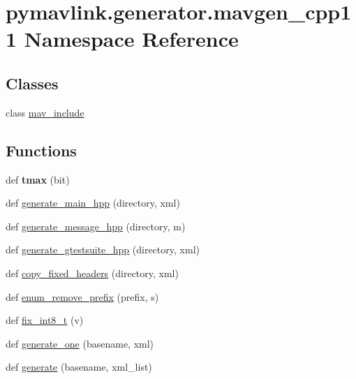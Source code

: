 \hypertarget{namespacepymavlink_1_1generator_1_1mavgen__cpp11}{}\section{pymavlink.\+generator.\+mavgen\+\_\+cpp11 Namespace Reference}
\label{namespacepymavlink_1_1generator_1_1mavgen__cpp11}
\subsection*{Classes}
\begin{DoxyCompactItemize}
\item 
class \hyperlink{classpymavlink_1_1generator_1_1mavgen__cpp11_1_1mav__include}{mav\+\_\+include}
\end{DoxyCompactItemize}
\subsection*{Functions}
\begin{DoxyCompactItemize}
\item 
\mbox{\label{namespacepymavlink_1_1generator_1_1mavgen__cpp11_af2c11cc64c4dac58aa5a7dd8702a5edd}} 
def {\bfseries tmax} (bit)
\item 
def \hyperlink{namespacepymavlink_1_1generator_1_1mavgen__cpp11_a8588e20abc9c34779923fda932483ace}{generate\+\_\+main\+\_\+hpp} (directory, xml)
\item 
def \hyperlink{namespacepymavlink_1_1generator_1_1mavgen__cpp11_a45ff369d71421e11a26c7a69c2f8de6c}{generate\+\_\+message\+\_\+hpp} (directory, m)
\item 
def \hyperlink{namespacepymavlink_1_1generator_1_1mavgen__cpp11_a1eb8c2ef48de5401c229cf9815761666}{generate\+\_\+gtestsuite\+\_\+hpp} (directory, xml)
\item 
def \hyperlink{namespacepymavlink_1_1generator_1_1mavgen__cpp11_a1780acf401220c5fc94513ec4e40fca4}{copy\+\_\+fixed\+\_\+headers} (directory, xml)
\item 
def \hyperlink{namespacepymavlink_1_1generator_1_1mavgen__cpp11_a62a78fb03297e16426b20e29b0f97332}{enum\+\_\+remove\+\_\+prefix} (prefix, s)
\item 
def \hyperlink{namespacepymavlink_1_1generator_1_1mavgen__cpp11_a73fbdce6f04ff5bff120f5c0aca0effb}{fix\+\_\+int8\+\_\+t} (v)
\item 
def \hyperlink{namespacepymavlink_1_1generator_1_1mavgen__cpp11_a64628a652f5243b623280750d9655f7e}{generate\+\_\+one} (basename, xml)
\item 
def \hyperlink{namespacepymavlink_1_1generator_1_1mavgen__cpp11_aa4f8d0bd184389b7d9c14bba66482add}{generate} (basename, xml\+\_\+list)
\end{DoxyCompactItemize}

